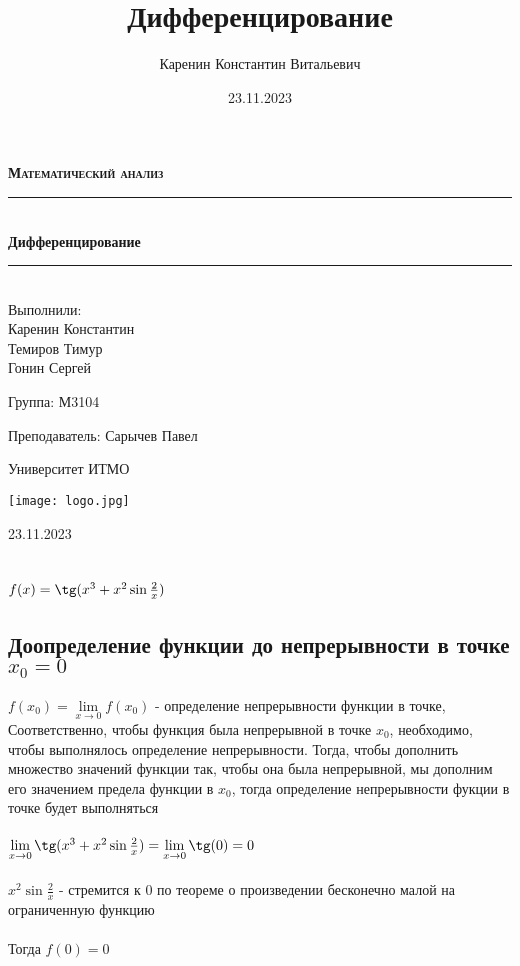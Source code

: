 \documentclass{article}
\title{Дифференцирование}
\author{Каренин Константин Витальевич}
\date{23.11.2023}
\begin{document}
\begin{titlepage}
    \centering
    \vspace*{0.5 cm}
    
    \textsc{\LARGE \textbf{Математический анализ}}
    \vspace{1.5cm}
    
    \rule{\linewidth}{0.2 mm} \\[0.4 cm]
    { \huge \bfseries Дифференцирование}
    \rule{\linewidth}{0.2 mm} \\[1.5 cm]
    
    \Large Выполнили: \\
    Каренин Константин \\
    Темиров Тимур \\
    Гонин Сергей \\
    
    \vspace{0.5cm}
    
    Группа: М3104
    
    \vspace{0.5cm}
    
    Преподаватель: Сарычев Павел
    
    \vspace{0.5cm}
    
    Университет ИТМО
    
    \vfill

    \texttt{[image: logo.jpg]}
    
    23.11.2023
    
\end{titlepage}

\setcounter{page}{2}

\newpage
\section{$f(x)=\tg(x^3+x^2\sin\frac{2}{x})$}
    \subsection{Доопределение функции до непрерывности в точке $x_0=0$}
    $f(x_0) = \lim\limits_{x \to 0} f(x_0)$ - определение непрерывности функции в точке, Соответственно, чтобы функция была непрерывной  в точке $x_0$, необходимо, чтобы выполнялось определение непрерывности. Тогда, чтобы дополнить множество значений функции так, чтобы она была непрерывной, мы дополним его значением предела функции в $x_0$, тогда определение непрерывности фукции в точке будет выполняться \\ \\
    $\lim\limits_{x \to 0} \tg ( x^3 + x^2 \sin \frac{2}{x}) = \lim\limits_{x \to 0} \tg (0) = 0$ \\ \\
    $x^2 \sin \frac{2}{x}$ - стремится к 0 по теореме о произведении бесконечно малой на ограниченную функцию \\ \\
    Тогда $f(0) = 0$
    
\end{document}
